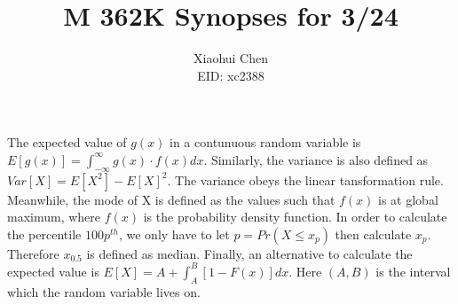 \documentclass[12pt]{article}
\author{Xiaohui Chen \\EID: xc2388}
\title{M 362K Synopses for 3/24}
\begin{document}
\maketitle
\begin{spacing}{2.0}

The expected value of $g(x)$ in a contunuous random variable is $E[g(x)]= \int_{-\infty}^{\infty} g(x)\cdot f(x) dx$. Similarly, the variance is also defined as $Var[X]= E[X^2]- E[X]^2$. The variance obeys the linear tansformation rule. Meanwhile, the mode of X is defined as the values such that $f(x)$ is at global maximum, where $f(x)$ is the probability density function. In order to calculate the percentile $100p^{th}$, we only have to let $p=Pr(X\le x_p)$ then calculate $x_p$. Therefore $x_{0.5}$ is defined as median. Finally, an alternative to calculate the expected value is $E[X]= A+ \int_{A}^{B} [1-F(x)] dx$. Here $(A,B)$ is the interval which the random variable lives on. 

\end{spacing}
\end{document}
